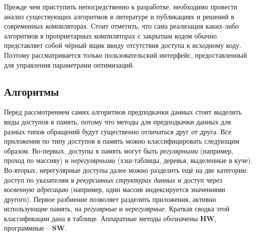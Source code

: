 \documentclass[12pt,a4paper]{article}
\begin{document}
\indent

Прежде чем приступить непосредственно к разработке, необходимо провести анализ существующих алгоритмов в литературе и публикациях и решений в современных компиляторах. Стоит отметить, что сама реализация каких-либо алгоритмов в проприетарных компиляторах с закрытым кодом обычно представляет собой чёрный ящик ввиду отсутствия доступа к исходному коду. Поэтому рассматривается только пользовательский интерфейс, предоставленный для управления параметрами оптимизаций.

\subsection{Алгоритмы}

\indent

Перед рассмотрением самих алгоритмов предподкачки данных стоит выделить виды доступов в память, потому что методы для предподкачки данных для разных типов обращений будут существенно отличаться друг от друга. Все приложения по типу доступов в память можно классифицировать следующим образом. Во-первых, доступы в память могут быть \emph{регулярными} (например, проход по массиву) и \emph{нерегулярными} (хэш-таблицы, деревья, выделенные в куче). Во-вторых, нерегулярные доступы далее можно разделить ещё на две категории: доступ по указателям в \emph{рекурсивных структурах данных} и доступ через \emph{косвенную адресацию} (например, один массив индексируется значениями другого). Первое разбиение позволяет разделить приложения, активно использующие память, на \emph{регулярные} и \emph{нерегулярные}. Краткая сводка этой классификации дана в таблице. Аппаратные методы обозначены \textbf{HW}, программные -- \textbf{SW}.
\end{document}
